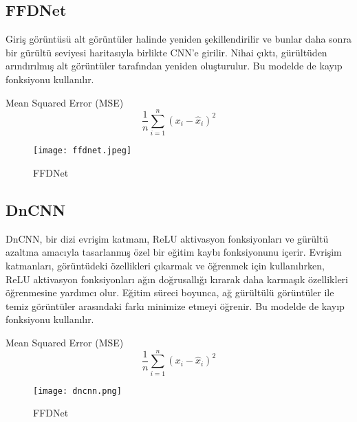 \documentclass{article}
\begin{document}
\newpage
\subsection{FFDNet}

\noindent Giriş görüntüsü alt görüntüler halinde yeniden şekillendirilir ve bunlar daha sonra bir gürültü seviyesi haritasıyla birlikte CNN’e girilir. Nihai çıktı, gürültüden arındırılmış alt görüntüler tarafından yeniden oluşturulur. Bu modelde de kayıp fonksiyonu kullanılır.
\vspace{1 cm}

Mean Squared Error (MSE) 
\begin{equation}
    \frac{1}{n} \sum_{i=1}^{n} (x_{i} - \hat{x}_{i})^2
\end{equation}

\renewcommand{\figurename}{Şekil}

\begin{figure}[htbp]
     \centering
\texttt{[image: ffdnet.jpeg]}\centering 
  \caption{FFDNet\cite{zhang2018ffdnet}}
  \label{fig:resim_etiketi}
\end{figure}

\subsection{DnCNN}

\noindent DnCNN, bir dizi evrişim katmanı, ReLU aktivasyon fonksiyonları ve gürültü azaltma amacıyla tasarlanmış özel bir eğitim kaybı fonksiyonunu içerir. Evrişim katmanları, görüntüdeki özellikleri çıkarmak ve öğrenmek için kullanılırken, ReLU aktivasyon fonksiyonları ağın doğrusallığı kırarak daha karmaşık özellikleri öğrenmesine yardımcı olur. Eğitim süreci boyunca, ağ gürültülü görüntüler ile temiz görüntüler arasındaki farkı minimize etmeyi öğrenir. Bu modelde de kayıp fonksiyonu kullanılır.\vspace{1 cm}

Mean Squared Error (MSE) 
\begin{equation}
    \frac{1}{n} \sum_{i=1}^{n} (x_{i} - \hat{x}_{i})^2
\end{equation}

\renewcommand{\figurename}{Şekil}

\begin{figure}[htbp]
     \centering
\texttt{[image: dncnn.png]}\centering 
  \caption{FFDNet\cite{alawode2021dense}}
  \label{fig:resim_etiketi}
\end{figure}
\newpage
\end{document}
